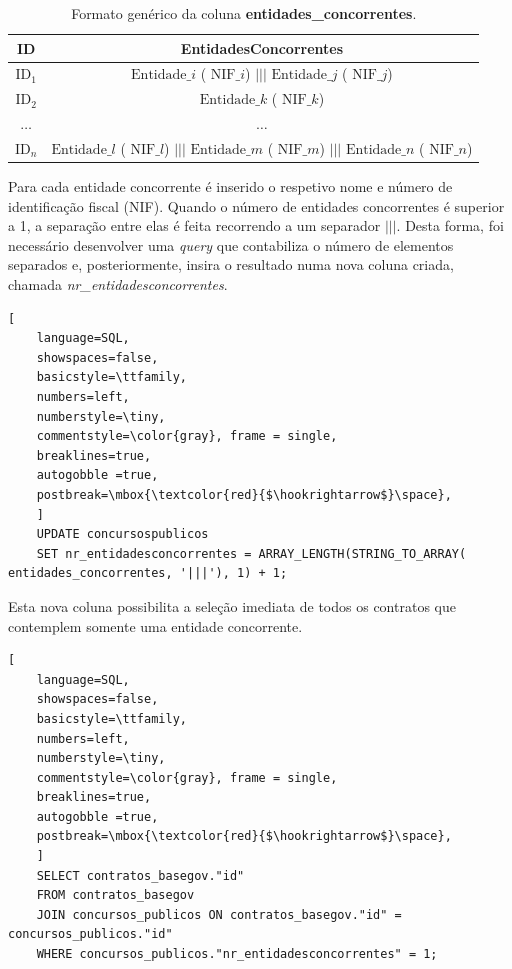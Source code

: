 \begin{table}[H]
	\centering
	\begin{tabular}{|c|c|}
		\hline
		\textbf{ID}   & \textbf{EntidadesConcorrentes}                                                                                                      \\ \hline
		$\text{ID}_1$ & $\text{Entidade}\_i$ ( $\text{NIF}\_i$) $|||$ $\text{Entidade}\_j$ ( $\text{NIF}\_j$)                                               \\ \hline
		$\text{ID}_2$ & $\text{Entidade}\_k$ ( $\text{NIF}\_k$)                                                                                             \\ \hline
		$\dots$       & $\dots$                                                                                                                             \\ \hline
		$\text{ID}_n$ & $\text{Entidade}\_l$ ( $\text{NIF}\_l$) $|||$ $\text{Entidade}\_m$ ( $\text{NIF}\_m$) $|||$ $\text{Entidade}\_n$ ( $\text{NIF}\_n$) \\ \hline
	\end{tabular}
	\caption{Formato genérico da coluna \textbf{entidades\_concorrentes}.}
	\label{tab:entsconc}
\end{table}

Para cada entidade concorrente é inserido o respetivo nome e número de identificação fiscal (NIF). Quando o número de entidades concorrentes é superior a 1, a separação entre elas é feita recorrendo a um separador $|||$. Desta forma, foi necessário desenvolver uma \textit{query} que contabiliza o número de elementos separados e, posteriormente, insira o resultado numa nova coluna criada, chamada \textit{nr\_entidadesconcorrentes}.


\begin{lstlisting}[
	language=SQL,
	showspaces=false,
	basicstyle=\ttfamily,
	numbers=left,
	numberstyle=\tiny,
	commentstyle=\color{gray}, frame = single,
	breaklines=true,
	autogobble =true,
	postbreak=\mbox{\textcolor{red}{$\hookrightarrow$}\space},
	]
	UPDATE concursospublicos
	SET nr_entidadesconcorrentes = ARRAY_LENGTH(STRING_TO_ARRAY( entidades_concorrentes, '|||'), 1) + 1;	
\end{lstlisting}

Esta nova coluna possibilita a seleção imediata de todos os contratos que contemplem somente uma entidade concorrente.

\begin{lstlisting}[
	language=SQL,
	showspaces=false,
	basicstyle=\ttfamily,
	numbers=left,
	numberstyle=\tiny,
	commentstyle=\color{gray}, frame = single,
	breaklines=true,
	autogobble =true,
	postbreak=\mbox{\textcolor{red}{$\hookrightarrow$}\space},
	]
	SELECT contratos_basegov."id"
	FROM contratos_basegov
	JOIN concursos_publicos ON contratos_basegov."id" = concursos_publicos."id"
	WHERE concursos_publicos."nr_entidadesconcorrentes" = 1;
\end{lstlisting}

